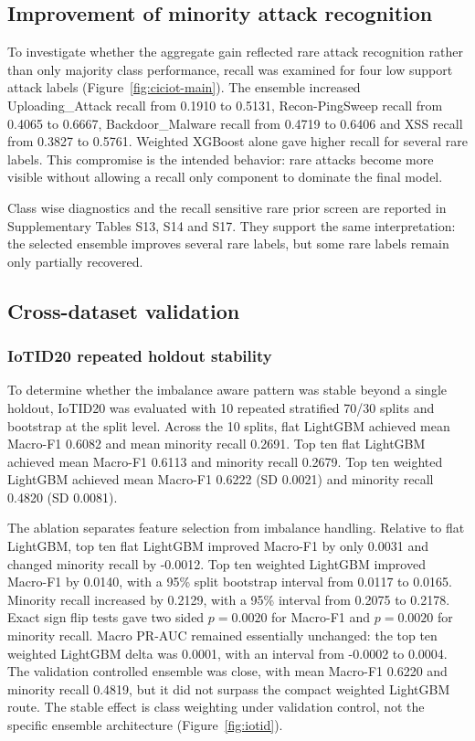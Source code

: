 \documentclass[fleqn,10pt]{wlscirep}
\begin{document}
\subsection*{Improvement of minority attack recognition}

To investigate whether the aggregate gain reflected rare attack recognition rather than only majority class performance, recall was examined for four low support attack labels (Figure~\ref{fig:ciciot-main}). The ensemble increased Uploading\_Attack recall from 0.1910 to 0.5131, Recon-PingSweep recall from 0.4065 to 0.6667, Backdoor\_Malware recall from 0.4719 to 0.6406 and XSS recall from 0.3827 to 0.5761. Weighted XGBoost alone gave higher recall for several rare labels. This compromise is the intended behavior: rare attacks become more visible without allowing a recall only component to dominate the final model.

Class wise diagnostics and the recall sensitive rare prior screen are reported in Supplementary Tables S13, S14 and S17. They support the same interpretation: the selected ensemble improves several rare labels, but some rare labels remain only partially recovered.

\subsection*{Cross-dataset validation}

\subsubsection*{IoTID20 repeated holdout stability}

To determine whether the imbalance aware pattern was stable beyond a single holdout, IoTID20 was evaluated with 10 repeated stratified 70/30 splits and bootstrap at the split level. Across the 10 splits, flat LightGBM achieved mean Macro-F1 0.6082 and mean minority recall 0.2691. Top ten flat LightGBM achieved mean Macro-F1 0.6113 and minority recall 0.2679. Top ten weighted LightGBM achieved mean Macro-F1 0.6222 (SD 0.0021) and minority recall 0.4820 (SD 0.0081).

The ablation separates feature selection from imbalance handling. Relative to flat LightGBM, top ten flat LightGBM improved Macro-F1 by only 0.0031 and changed minority recall by -0.0012. Top ten weighted LightGBM improved Macro-F1 by 0.0140, with a 95\% split bootstrap interval from 0.0117 to 0.0165. Minority recall increased by 0.2129, with a 95\% interval from 0.2075 to 0.2178. Exact sign flip tests gave two sided $p=0.0020$ for Macro-F1 and $p=0.0020$ for minority recall. Macro PR-AUC remained essentially unchanged: the top ten weighted LightGBM delta was 0.0001, with an interval from -0.0002 to 0.0004. The validation controlled ensemble was close, with mean Macro-F1 0.6220 and minority recall 0.4819, but it did not surpass the compact weighted LightGBM route. The stable effect is class weighting under validation control, not the specific ensemble architecture (Figure~\ref{fig:iotid}).
\end{document}
